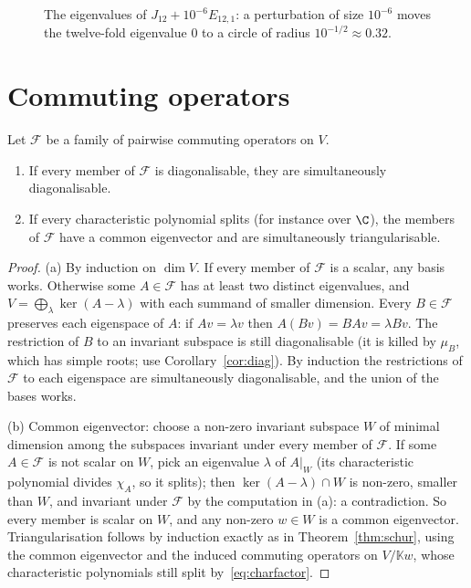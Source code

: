 \begin{figure}[ht]
\centering
{}
\caption{The eigenvalues of $J_{12}+10^{-6}E_{12,1}$: a perturbation of size $10^{-6}$ moves the twelve-fold eigenvalue $0$
to a circle of radius $10^{-1/2}\approx0.32$.}
\label{fig:perturb}
\end{figure}

\section{Commuting operators}

\begin{theorem}\label{thm:commuting}
Let $\mathcal F$ be a family of pairwise commuting operators on $V$.
\begin{enumerate}[label=(\alph*)]
\item If every member of $\mathcal F$ is diagonalisable, they are simultaneously diagonalisable.
\item If every characteristic polynomial splits (for instance over $\C$), the members of $\mathcal F$ have a common
eigenvector and are simultaneously triangularisable.
\end{enumerate}
\end{theorem}
\begin{proof}
(a) By induction on $\dim V$. If every member of $\mathcal F$ is a scalar, any basis works. Otherwise some $A\in\mathcal F$
has at least two distinct eigenvalues, and $V=\bigoplus_\lambda\ker(A-\lambda)$ with each summand of smaller dimension. Every
$B\in\mathcal F$ preserves each eigenspace of $A$: if $Av=\lambda v$ then $A(Bv)=BAv=\lambda Bv$. The restriction of $B$ to an
invariant subspace is still diagonalisable (it is killed by $\mu_B$, which has simple roots; use Corollary~\ref{cor:diag}).
By induction the restrictions of $\mathcal F$ to each eigenspace are simultaneously diagonalisable, and the union of the
bases works.

(b) Common eigenvector: choose a non-zero invariant subspace $W$ of minimal dimension among the subspaces invariant under
every member of $\mathcal F$. If some $A\in\mathcal F$ is not scalar on $W$, pick an eigenvalue $\lambda$ of $A|_W$ (its
characteristic polynomial divides $\chi_A$, so it splits); then $\ker(A-\lambda)\cap W$ is non-zero, smaller than $W$, and
invariant under $\mathcal F$ by the computation in (a): a contradiction. So every member is scalar on $W$, and any non-zero
$w\in W$ is a common eigenvector. Triangularisation follows by induction exactly as in Theorem~\ref{thm:schur}, using
the common eigenvector and the induced commuting operators on $V/\mathbb Kw$, whose characteristic polynomials still split
by~\eqref{eq:charfactor}.
\end{proof}

